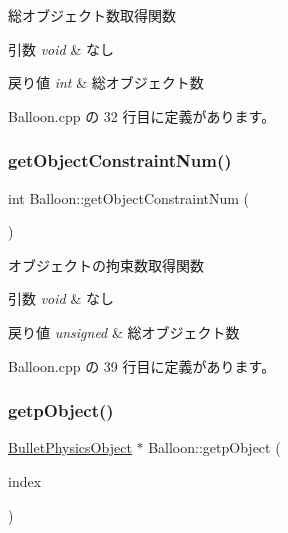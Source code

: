 総オブジェクト数取得関数 


\begin{DoxyParams}{引数}
{\em void} & なし \\
\hline
\end{DoxyParams}

\begin{DoxyRetVals}{戻り値}
{\em int} & 総オブジェクト数 \\
\hline
\end{DoxyRetVals}


 Balloon.\+cpp の 32 行目に定義があります。

\mbox{\label{class_balloon_ae36b5f71bde6e84037f200443774bd3a}} 
\subsubsection{\texorpdfstring{get\+Object\+Constraint\+Num()}{getObjectConstraintNum()}}
{\footnotesize\ttfamily int Balloon\+::get\+Object\+Constraint\+Num (\begin{DoxyParamCaption}{ }\end{DoxyParamCaption})}



オブジェクトの拘束数取得関数 


\begin{DoxyParams}{引数}
{\em void} & なし \\
\hline
\end{DoxyParams}

\begin{DoxyRetVals}{戻り値}
{\em unsigned} & 総オブジェクト数 \\
\hline
\end{DoxyRetVals}


 Balloon.\+cpp の 39 行目に定義があります。

\mbox{\label{class_balloon_a24f6da4e76b5f174e3bf7598d832ffc0}} 
\subsubsection{\texorpdfstring{getp\+Object()}{getpObject()}}
{\footnotesize\ttfamily \mbox{\hyperlink{class_bullet_physics_object}{Bullet\+Physics\+Object}} $\ast$ Balloon\+::getp\+Object (\begin{DoxyParamCaption}\item[{unsigned}]{index }\end{DoxyParamCaption})}



